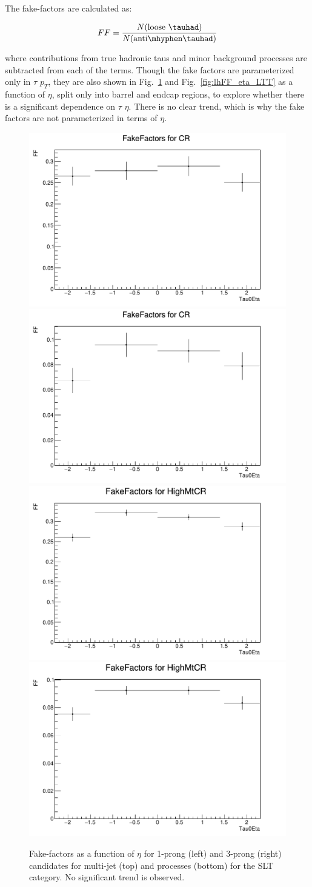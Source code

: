 The fake-factors are calculated as:

\begin{equation}
FF =  \frac{N(\text{loose }\tauhad)}{N(\mathrm{anti}\mhyphen\tauhad)}
\end{equation} 

where contributions from true hadronic taus and minor background processes are subtracted from 
each of the terms. Though the fake factors are parameterized only in $\tau$ $p_T$, they are also shown 
in Fig.~\ref{fig:lhFF_eta_SLT} and Fig.~\ref{fig:lhFF_eta_LTT} as a function of $\eta$, split only into barrel and endcap regions, to explore whether there is 
a significant dependence on $\tau$ $\eta$. There is no clear trend, which is why the fake factors are not parameterized in 
terms of $\eta$.

\begin{figure}
\centering
\includegraphics[width=.4\textwidth]{figures/lephadFF/SLT/FF_All_Preselection_Np1_CR_2tag_Tau0Eta}
\includegraphics[width=.4\textwidth]{figures/lephadFF/SLT/FF_All_Preselection_Np3_CR_2tag_Tau0Eta} \\
\includegraphics[width=.4\textwidth]{figures/lephadFF/SLT/FF_All_Preselection_Np1_HighMtCR_2tag_Tau0Eta}
\includegraphics[width=.4\textwidth]{figures/lephadFF/SLT/FF_All_Preselection_Np3_HighMtCR_2tag_Tau0Eta}\\
\caption{Fake-factors as a function of $\eta$ for 1-prong (left) and 3-prong (right) \tauhad candidates for multi-jet (top) and \ttbar processes (bottom) for the \lephad SLT category. No significant trend is observed.}
\label{fig:lhFF_eta_SLT}
\end{figure}

